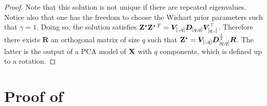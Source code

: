 \begin{proof}
Note that this solution is not unique if there are repeated eigenvalues. Notice also that one has the freedom to choose the Wishart prior parameters such that $\gamma=1$. Doing so, the solution satisfies $\mathbf{Z}^\star \mathbf{Z}^{\star \:T} = \bm{V}_{[:,q]} \bm{D}_{[q,q]} \bm{V}^\top_{[q,:]}$. Therefore there exists $\bm{R}$ an orthogonal matrix of size $q$ such that $\mathbf{Z}^{\star} = \bm{V}_{[:,q]}\bm{D}_{[q,q]}^{\frac{1}{2}}\bm{R}$. The latter is the output of a PCA model of $\mathbf{X}$ with $q$ components, which is defined up to a rotation.
\end{proof}

\section{Proof of } \label{proof:lambda_perp_integrability}

\integrabilitypairwiseMRF*

